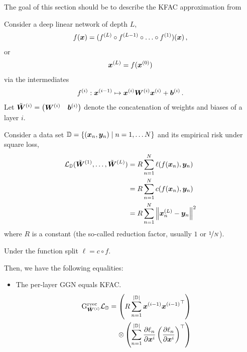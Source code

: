 The goal of this section should be to describe the KFAC approximation from~\cite{martens2015optimizing}
\begin{test}[KFAC]
  Consider a deep linear network of depth $L$,
  \begin{align*}
    f({\bm{x}}) = (f^{(L)} \circ f^{(L-1)} \circ \ldots \circ f^{(1)})({\bm{x}})\,,
  \end{align*}
  or
  \begin{align*}
    {\bm{x}}^{(L)} = f({\bm{x}}^{(0)})
  \end{align*}
  via the intermediates
  \begin{align*}
    f^{(i)}:  {\bm{x}}^{(i-1)} \mapsto {\bm{x}}^{(i)} {\bm{W}}^{(i)} {\bm{x}}^{(i)} + {\bm{b}}^{(i)}\,.
  \end{align*}
  Let $\tilde{{\bm{W}}}^{(i)} = \begin{pmatrix} {\bm{W}}^{(i)} & {\bm{b}}^{(i)}\end{pmatrix}$ denote the concatenation of weights and biases of a layer $i$.

  Consider a data set ${\mathbb{D}} = \left\{ ({\bm{x}}_n, {\bm{y}}_n) \mid n = 1, \dots N \right\}$ and its empirical risk under square loss,
  \begin{align*}
    {\mathcal{L}}_{{\mathbb{D}}}(\tilde{{\bm{W}}}^{(1)}, \dots, \tilde{{\bm{W}}}^{(L)})
    &=
      R \sum_{n=1}^N \ell(f({\bm{x}}_n), {\bm{y}}_n)
    \\
    &=
      R \sum_{n=1}^N c(f({\bm{x}}_n), {\bm{y}}_n)
    \\
    &=
      R \sum_{n=1}^N \left\lVert {\bm{x}}_n^{(L)} - {\bm{y}}_n  \right\rVert^2
  \end{align*}
  where $R$ is a constant (the so-called reduction factor, usually $1$ or $\nicefrac{1}{N}$).

  Under the function split $\ell = c \circ f$.

  Then, we have the following equalities:
  \begin{itemize}
  \item The per-layer GGN equals KFAC.
    \begin{align*}
      \mathrm{G}^{\operatorname{rvec}}_{\tilde{{\bm{W}}}^{(i)}} {\mathcal{L}}_{{\mathbb{D}}}
      =
      \left( R \sum_{n=1}^{|{\mathbb{D}}|} {\bm{x}}^{(i-1)} {{\bm{x}}^{(i-1)}}^{\top}  \right)
      \\
      \otimes
      \left(
      \sum_{n=1}^{|{\mathbb{D}}|} \frac{\partial \ell_n}{\partial {\bm{x}}^i}
      \left(
      \frac{\partial \ell_n}{\partial {\bm{x}}^i}
      \right)^{\top}
      \right)
    \end{align*}
  \end{itemize}

\end{test}


